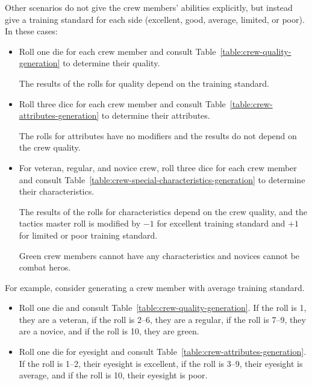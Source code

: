 \begin{advancedrules}
{Other scenarios do not give the crew members’ abilities explicitly, but instead give a training standard for each side (excellent, good, average, limited, or poor). In these cases:

\begin{itemize}
    
    \item Roll one die for each crew member and consult Table~\ref{table:crew-quality-generation} to determine their quality. 

    The results of the rolls for quality depend on the training standard.

    \item Roll three dice for each crew member and consult Table~\ref{table:crew-attributes-generation} to determine their attributes. 
    
    The rolls for attributes have no modifiers and the results do not depend on the crew quality.
    
    \item For veteran, regular, and novice crew, roll three dice for each crew member and consult Table~\ref{table:crew-special-characteristics-generation} to determine their characteristics. 
    
    The results of the rolls for characteristics depend on the crew quality, and the tactics master roll is modified by $-1$ for excellent training standard and $+1$ for limited or poor training standard. 
    
    Green crew members cannot have any characteristics and novices cannot be combat heros.
\end{itemize}


For example, consider generating a crew member with average training standard.

\begin{itemize}
\item Roll one die and consult Table~\ref{table:crew-quality-generation}. If the roll is 1, they are a veteran, if the roll is 2--6, they are a regular, if the roll is 7--9, they are a novice, and if the roll is 10, they are green.

\item Roll one die for eyesight and consult Table~\ref{table:crew-attributes-generation}. If the roll is 1--2, their eyesight is excellent, if the roll is 3--9, their eyesight is average, and if the roll is 10, their eyesight is poor. 


\end{itemize}}
\end{advancedrules}
